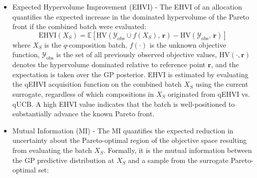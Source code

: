 \begin{itemize}

    \item Expected Hypervolume Improvement (EHVI) - The EHVI of an allocation quantifies the expected increase in the dominated hypervolume of the Pareto front if the combined batch were evaluated:
    \begin{equation}
    \label{eq:ehvi}
    \mathrm{EHVI}(X_S) = \mathbb{E}\!\left[
        \mathrm{HV}\!\left(\mathcal{Y}_\mathrm{obs} \cup f(X_S),\, \mathbf{r}\right)
        - \mathrm{HV}\!\left(\mathcal{Y}_\mathrm{obs},\, \mathbf{r}\right)
    \right]
    \end{equation}
    where $X_S$ is the $q$-composition batch, $f(\cdot)$ is the unknown objective function, $\mathcal{Y}_\mathrm{obs}$ is the set of all previously observed objective values, $\mathrm{HV}(\cdot, \mathbf{r})$ denotes the hypervolume dominated relative to reference point $\mathbf{r}$, and the expectation is taken over the GP posterior. EHVI is estimated by evaluating the qEHVI acquisition function on the combined batch $X_S$ using the current surrogate, regardless of which compositions in $X_S$ originated from qEHVI vs. qUCB. A high EHVI value indicates that the batch is well-positioned to substantially advance the known Pareto front.

    \item Mutual Information (MI) - The MI quantifies the expected reduction in uncertainty about the Pareto-optimal region of the objective space resulting from evaluating the batch $X_S$. Formally, it is the mutual information between the GP predictive distribution at $X_S$ and a sample from the surrogate Pareto-optimal set:


\end{itemize}
